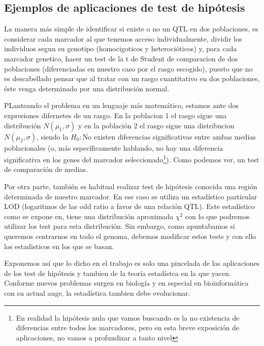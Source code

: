 \documentclass[a4paper,12pt]{article}
\begin{document}
\subsection{Ejemplos de aplicaciones de test de hipótesis}
La manera más simple de identificar si existe o no un QTL en dos poblaciones, es considerar cada marcador al que tenemos acceso individualmente, dividir los individuos segun su genotipo (homocigoticos y heterocióticos) y, para cada marcador genetico, hacer un test de la t de Student de comparacion de dos poblaciones (diferenciadas en nuestro caso por el rasgo escogido), puesto que no es descabellado pensar que al tratar con un rasgo cuantitativo en dos poblaciones, éste venga determinado por una distribución normal.

PLanteando el problema en un lenguaje más matemático, estamos ante dos expresiones difernetes de un rasgo. En la poblacion 1 el rasgo sigue una distribución $N(\mu_1,\sigma)$ y en la población 2 el rasgo sigue una distribucion $N(\mu_2,\sigma)$, siendo la $H_0:$No existen diferencias significativas entre ambas medias poblacionales (o, más específicamente hablando, no hay una diferencia significativa en los genes del marcador seleccionado\footnote{En realidad la hipótesis nula que vamos buscando es la no existencia de diferencias entre todos los marcadores, pero en esta breve exposición de aplicaciones, no vamos a profundizar a tanto nivel}).
Como podemos ver, un test de comparación de medias.

Por otra parte, también es habitual realizar test de hipótesis conocida una región determinada de nuestro marcador. En ese caso se utiliza un estadístico particular LOD (logaritmos de las odd ratio a favor de una relación QTL). Este estadístico como se expone en, tiene una distribución aproximada $\chi^2$
con lo que podremos utilizar los test para esta distribución.
Sin embargo, como apuntabamos si queremos centrarnos en todo el genoma, debemos modificar estos tests y con ello los estadisticos en los que se basan. 

Exponemos así que lo dicho en el trabajo es solo una pincelada de las aplicaciones de los test de hipótesis y tambien de la teoría estadístca en la que yacen. Conforme nuevos problemas surgen en biología y en especial en bioinformática con su actual auge, la estadística tambien debe evolucionar.
































\end{document}

